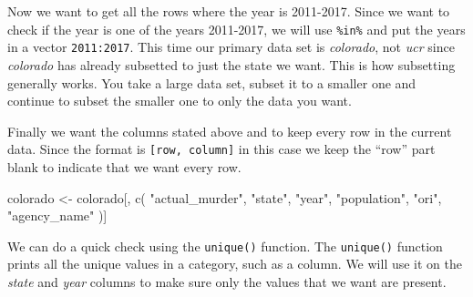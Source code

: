 \documentclass[
]{krantz}
\makeatletter
\newenvironment{Shaded}{\begin{snugshade}}{\end{snugshade}}
\newcommand{\CommentTok}[1]{\textcolor[rgb]{0.37,0.37,0.37}{\textit{#1}}}
\newcommand{\DecValTok}[1]{\textcolor[rgb]{0.06,0.06,0.06}{#1}}
\newcommand{\FunctionTok}[1]{\textcolor[rgb]{0,0,0}{#1}}
\newcommand{\NormalTok}[1]{#1}
\newcommand{\OtherTok}[1]{\textcolor[rgb]{0.37,0.37,0.37}{#1}}
\newcommand{\SpecialCharTok}[1]{\textcolor[rgb]{0,0,0}{#1}}
\newcommand{\StringTok}[1]{\textcolor[rgb]{0.5,0.5,0.5}{#1}}
\newenvironment{kframe}{%
\medskip{}
\setlength{\fboxsep}{.8em}
 \def\at@end@of@kframe{}%
 \ifinner\ifhmode%
  \def\at@end@of@kframe{\end{minipage}}%
  \begin{minipage}{\columnwidth}%
 \fi\fi%
 \def\FrameCommand##1{\hskip\@totalleftmargin \hskip-\fboxsep
 \colorbox{shadecolor}{##1}\hskip-\fboxsep
     \hskip-\linewidth \hskip-\@totalleftmargin \hskip\columnwidth}%
 \MakeFramed {\advance\hsize-\width
   \@totalleftmargin\z@ \linewidth\hsize
   \@setminipage}}%
 {\par\unskip\endMakeFramed%
 \at@end@of@kframe}
\renewenvironment{Shaded}{\begin{kframe}}{\end{kframe}}
\makeatother
\begin{document}
Now we want to get all the rows where the year is 2011-2017.
Since we want to check if the year is one of the years
2011-2017, we will use \texttt{\%in\%} and put the years in
a vector \texttt{2011:2017}. This time our primary data set
is \emph{colorado}, not \emph{ucr} since \emph{colorado} has
already subsetted to just the state we want. This is how
subsetting generally works. You take a large data set,
subset it to a smaller one and continue to subset the
smaller one to only the data you want.

\begin{Shaded}
\end{Shaded}

Finally we want the columns stated above and to keep every
row in the current data. Since the format is
\texttt{{[}row,\ column{]}} in this case we keep the ``row''
part blank to indicate that we want every row.

\begin{Shaded}
\begin{Highlighting}[]
\NormalTok{colorado }\OtherTok{\textless{}{-}}\NormalTok{ colorado[, }\FunctionTok{c}\NormalTok{(}
  \StringTok{"actual\_murder"}\NormalTok{,}
  \StringTok{"state"}\NormalTok{,}
  \StringTok{"year"}\NormalTok{,}
  \StringTok{"population"}\NormalTok{,}
  \StringTok{"ori"}\NormalTok{,}
  \StringTok{"agency\_name"}
\NormalTok{)]}
\end{Highlighting}
\end{Shaded}

We can do a quick check using the \texttt{unique()}
function. The \texttt{unique()} function prints all the
unique values in a category, such as a column. We will use
it on the \emph{state} and \emph{year} columns to make sure
only the values that we want are present.

\begin{Shaded}
\end{Shaded}

\begin{Shaded}
\end{Shaded}
\end{document}
